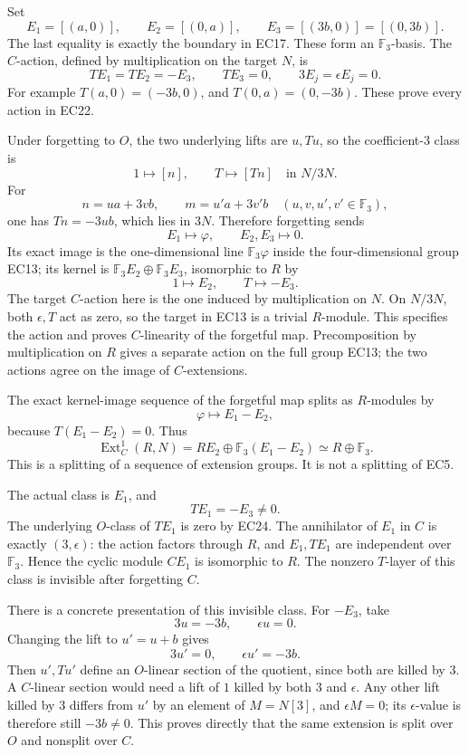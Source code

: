 \documentclass[
  10pt,
  a4paper,
]{article}
\begin{document}
Set \[
E_1=[(a,0)],\qquad E_2=[(0,a)],\qquad
E_3=[(3b,0)]=[(0,3b)].
\tag{EC21}
\] The last equality is exactly the boundary in EC17. These form an
\(\mathbb F_3\)-basis. The \(C\)-action, defined by multiplication on
the target \(N\), is \[
TE_1=TE_2=-E_3,\qquad TE_3=0,\qquad
3E_j=\epsilon E_j=0.
\tag{EC22}
\] For example \(T(a,0)=(-3b,0)\), and \(T(0,a)=(0,-3b)\). These prove
every action in EC22.

Under forgetting to \(O\), the two underlying lifts are \(u,Tu\), so the
coefficient-3 class is \[
1\longmapsto[n],\qquad T\longmapsto[Tn]
\quad\text{in }N/3N.
\tag{EC23}
\] For \[
n=u a+3v b,\qquad m=u'a+3v'b
\quad(u,v,u',v'\in\mathbb F_3),
\] one has \(Tn=-3u b\), which lies in \(3N\). Therefore forgetting
sends \[
E_1\mapsto\varphi,\qquad E_2,E_3\mapsto0.
\tag{EC24}
\] Its exact image is the one-dimensional line \(\mathbb F_3\varphi\)
inside the four-dimensional group EC13; its kernel is
\(\mathbb F_3E_2\oplus\mathbb F_3E_3\), isomorphic to \(R\) by \[
1\mapsto E_2,\qquad T\mapsto-E_3.
\] The target \(C\)-action here is the one induced by multiplication on
\(N\). On \(N/3N\), both \(\epsilon,T\) act as zero, so the target in
EC13 is a trivial \(R\)-module. This specifies the action and proves
\(C\)-linearity of the forgetful map. Precomposition by multiplication
on \(R\) gives a separate action on the full group EC13; the two actions
agree on the image of \(C\)-extensions.

The exact kernel-image sequence of the forgetful map splits as
\(R\)-modules by \[
\varphi\longmapsto E_1-E_2,
\] because \(T(E_1-E_2)=0\). Thus \[
\operatorname{Ext}^1_C(R,N)
=R E_2\oplus\mathbb F_3(E_1-E_2)
\simeq R\oplus\mathbb F_3.
\tag{EC25}
\] This is a splitting of a sequence of extension groups. It is not a
splitting of EC5.

The actual class is \(E_1\), and \[
TE_1=-E_3\ne0.
\tag{EC26}
\] The underlying \(O\)-class of \(TE_1\) is zero by EC24. The
annihilator of \(E_1\) in \(C\) is exactly \((3,\epsilon)\): the action
factors through \(R\), and \(E_1,TE_1\) are independent over
\(\mathbb F_3\). Hence the cyclic module \(CE_1\) is isomorphic to
\(R\). The nonzero \(T\)-layer of this class is invisible after
forgetting \(C\).

There is a concrete presentation of this invisible class. For \(-E_3\),
take \[
3u=-3b,\qquad\epsilon u=0.
\] Changing the lift to \(u'=u+b\) gives \[
3u'=0,\qquad \epsilon u'=-3b.
\tag{EC27}
\] Then \(u',Tu'\) define an \(O\)-linear section of the quotient, since
both are killed by 3. A \(C\)-linear section would need a lift of \(1\)
killed by both 3 and \(\epsilon\). Any other lift killed by 3 differs
from \(u'\) by an element of \(M=N[3]\), and \(\epsilon M=0\); its
\(\epsilon\)-value is therefore still \(-3b\ne0\). This proves directly
that the same extension is split over \(O\) and nonsplit over \(C\).
\end{document}
